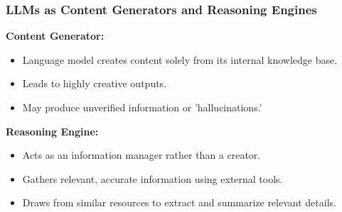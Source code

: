 \begin{frame}[fragile]
\frametitle{LLMs as Content Generators and Reasoning Engines}

\textbf{Content Generator:}
\begin{itemize}
    \item Language model creates content solely from its internal knowledge base.
    \item Leads to highly creative outputs.
    \item May produce unverified information or 'hallucinations.'
\end{itemize}

\textbf{Reasoning Engine:}
\begin{itemize}
    \item Acts as an information manager rather than a creator.
    \item Gathers relevant, accurate information using external tools.
    \item Draws from similar resources to extract and summarize relevant details.
\end{itemize}

\end{frame}

